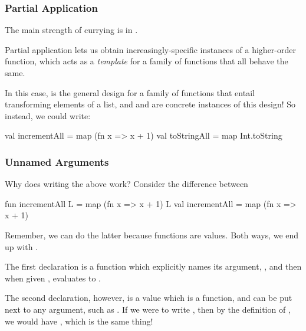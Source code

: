 \documentclass[aspectratio=169, handout]{beamer}
\begin{document}
\begin{frame}[fragile]
  \frametitle{Partial Application}

  The main strength of currying is in .

  \pause
  \vspace{\fill}


  \pause
  \vspace{\fill}

  Partial application lets us obtain increasingly-specific instances of a higher-order
  function, which acts as a \textit{template} for a family of functions that all behave
  the same.

  \pause
  \vspace{\fill}

  In this case,  is the general design for a family of functions that entail
  transforming elements of a list, and  and  are
  concrete instances of this design! So instead, we could write:

  \pause
  \begin{codeblock}
    val incrementAll = map (fn x => x + 1)
    val toStringAll = map Int.toString
  \end{codeblock}
\end{frame}

\begin{frame}[fragile]
  \frametitle{Unnamed Arguments}

  Why does writing the above work? Consider the difference between
  \begin{codeblock}
    fun incrementAll L = map (fn x => x + 1) L
    val incrementAll = map (fn x => x + 1)
  \end{codeblock}

  \pause
  \vspace{\fill}

  Remember, we can do the latter because functions are values. Both ways,
  we end up with .

  \pause
  \vspace{\fill}

  The first declaration is a function which explicitly names its argument,
  , and then when given , evaluates to .

  \pause
  \vspace{\fill}

  The second declaration, however, is a value which is a function, and can
  be put next to any argument, such as . If we were to write
  , then by the definition of ,
  we would have , which is the same thing!
\end{frame}
\end{document}
